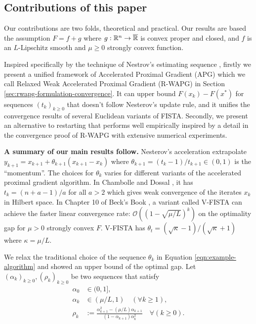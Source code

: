\documentclass[12pt]{article}
\begin{document}
    \subsection{Contributions of this paper}
        Our contributions are two folds, theoretical and practical.
        Our results are based the assumption $F = f + g$ where $g:\mathbb R^n \rightarrow \overline{\mathbb R}$ is convex proper and closed, and $f$ is an $L$-Lipschitz smooth and $\mu \ge 0$ strongly convex function.
        \par
        Inspired specifically by the technique of Nestrov's estimating sequence \cite{nesterov_lectures_2018}, firstly we present a unified framework of Accelerated Proximal Gradient (APG) which we call Relaxed Weak Accelerated Proximal Gradient (R-WAPG) in Section \ref{sec:rwapg-formulation-convergence}.
        It can upper bound $F(x_k) - F(x^*)$ for sequences $(t_k)_{k \ge 0}$ that doesn't follow Nesterov's update rule, and it unifies the convergence results of several Euclidean variants of FISTA.
        Secondly, we present an alternative to restarting that performs well empirically inspired by a detail in the convergence proof of R-WAPG with extensive numerical experiments.
        \par
        \textbf{A summary of our main results follow. }
        Nesterov's acceleration extrapolate $y_{k + 1} = x_{k + 1} + \theta_{k + 1}(x_{k + 1} - x_k)$ where $\theta_{k + 1} = (t_{k} - 1)/t_{k + 1} \in (0, 1)$ is the ``momentum''.
        The choices for $\theta_k$ varies for different variants of the accelerated proximal gradient algorithm.
        In Chambolle and Dossal \cite{chambolle_convergence_2015}, it has $t_k = (n + a - 1)/a$ for all $a > 2$ which gives weak convergence of the iterates $x_k$ in Hilbert space.
        In Chapter 10 of Beck's Book \cite{beck_first-order_2017}, a variant called V-FISTA can achieve the faster linear convergence rate: $\mathcal O((1 - \sqrt{\mu/L})^k)$ on the optimality gap for $\mu > 0$ strongly convex $F$.
        V-FISTA has $\theta_t = (\sqrt{\kappa} - 1)/(\sqrt{\kappa} + 1)$ where $\kappa = \mu/L$.
        \par
        We relax the traditional choice of the sequence $\theta_k$ in Equation \eqref{eqn:example-algorithm} and showed an upper bound of the optimal gap.
        Let $(\alpha_k)_{k \ge0}, (\rho_k)_{k \ge 0}$ be two sequences that satisfy
        \begin{align*}
            \alpha_0 &\in (0, 1],
            \\
            \alpha_k &\in (\mu/L, 1) \quad (\forall k \ge 1),
            \\
            \rho_k &:= \frac{\alpha_{k + 1}^2 - (\mu/L)\alpha_{k + 1}}{(1 - \alpha_{k + 1})\alpha_k^2} \quad \forall (k \ge 0).
        \end{align*}
\end{document}
